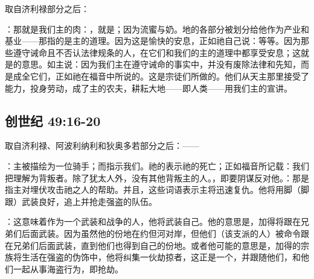 取自济利禄部分之后：\par

：那就是我们主的肉：，就是；因为流蜜与奶。地的各部分被划分给他作为产业和基业——那指的是主的道理。因为这是愉快的安息，正如祂自己说：等等。因为那些遵守诫命且不否认法律规条的人，在它们和我们的主的道理中都享受安息；这就是的意思。如主说：因为我们主在遵守诫命的事实中，并没有废除法律和先知，而是成全它们，正如祂在福音中所说的。这是宗徒们所做的。他们从天主那里接受了能力，投身劳动，成了主的农夫，耕耘大地——即人类——用我们主的宣讲。\par


\subsection{创世纪 49:16-20}

\par

取自济利禄、阿波利纳利和狄奥多若部分之后：——\par

：主被描绘为一位骑手；而指示我们。祂的表示祂的死亡；正如福音所记载：我们把理解为背叛者。除了犹太人外，没有其他背叛主的人。，即要阴谋反对他。：那是指主对埋伏攻击祂之人的帮助。并且，这些词语表示主将迅速复仇。他将用脚（脚跟）武装良好，追上并抢走强盗的队伍。\par

：这意味着作为一个武装和战争的人，他将武装自己。他的意思是，加得将跟在兄弟们后面武装。因为虽然他的份地在约但河对岸，但他们（该支派的人）被命令跟在兄弟们后面武装，直到他们也得到自己的份地。或者他可能的意思是，加得的宗族将生活在强盗的伪饰中，他将纠集一伙劫掠者，这正是一个，并跟随他们，和他们一起从事海盗行为，即抢劫。\par

